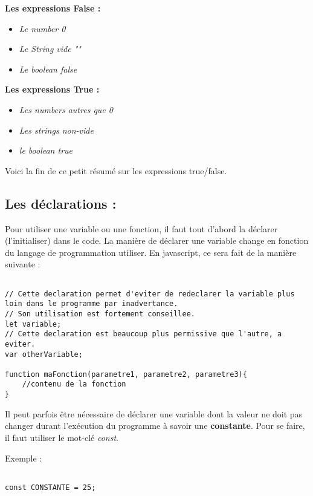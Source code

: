 \documentclass[a4paper, 11pt]{scrartcl}
\begin{document}
\textbf{Les expressions False :}

\begin{itemize}
\item \textit{Le number 0}
\item \textit{Le String vide ""}
\item \textit{Le boolean false}
\end{itemize}

\textbf{Les expressions True : }

\begin{itemize}
\item \textit{Les numbers autres que 0}
\item \textit{Les strings non-vide}
\item \textit{le boolean true}
\end{itemize}

Voici la fin de ce petit résumé sur les expressions true/false.

\subsection{Les déclarations :}
Pour utiliser une variable ou une fonction, il faut tout d'abord la déclarer (l'initialiser) dans le code.  La manière de déclarer une variable change en fonction du langage de programmation utiliser. En javascript, ce sera fait de la manière suivante :

\begin{lstlisting}

// Cette declaration permet d'eviter de redeclarer la variable plus loin dans le programme par inadvertance.
// Son utilisation est fortement conseillee.
let variable;
// Cette declaration est beaucoup plus permissive que l'autre, a eviter.
var otherVariable;

function maFonction(parametre1, parametre2, parametre3){
	//contenu de la fonction
}

\end{lstlisting}

Il peut parfois être nécessaire de déclarer une variable dont la valeur ne doit pas changer durant l'exécution du programme à savoir une \textbf{constante}.  Pour se faire, il faut utiliser le mot-clé \textit{const}.

Exemple :

\begin{lstlisting}

const CONSTANTE = 25;

\end{lstlisting} 
\end{document}
